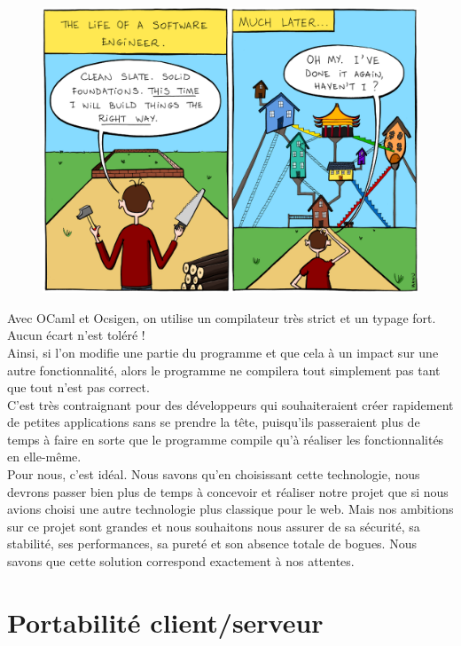 \documentclass{life-fr}
\begin{document}
\begin{figure}[H]
  \begin{center}
    \includegraphics[width=13cm]{img/proj.png}
  \end{center}
\end{figure}

\newpage

Avec OCaml et Ocsigen, on utilise un compilateur très strict et un typage fort. Aucun écart n'est toléré !\\
Ainsi, si l'on modifie une partie du programme et que cela à un impact sur une autre fonctionnalité, alors le programme ne compilera tout simplement pas tant que tout n'est pas correct.\\

C'est très contraignant pour des développeurs qui souhaiteraient créer rapidement de petites applications sans se prendre la tête, puisqu'ils passeraient plus de temps à faire en sorte que le programme compile qu'à réaliser les fonctionnalités en elle-même.\\
Pour nous, c'est idéal. Nous savons qu'en choisissant cette technologie, nous devrons passer bien plus de temps à concevoir et réaliser notre projet que si nous avions choisi une autre technologie plus classique pour le web. Mais nos ambitions sur ce projet sont grandes et nous souhaitons nous assurer de sa sécurité, sa stabilité, ses performances, sa pureté et son absence totale de bogues. Nous savons que cette solution correspond exactement à nos attentes.
\\

\section{Portabilité client/serveur}
\end{document}
